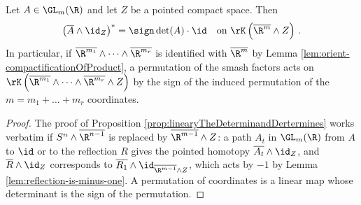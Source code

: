 \begin{lemma}\label{lem:filt-linearMapsOnSmash}
	Let $A\in\GL_m(\R)$ and let $Z$ be a pointed compact space. Then 
	\begin{equation*}
		\left(\overline{A}\wedge \id_Z\right)^*=\sign\det(A)\cdot\id\quad\text{on }\rK\left(\overline{\R^m}\wedge Z\right)\,.
	\end{equation*}
	In particular, if $\overline{\R^{m_1}}\wedge\dots\wedge\overline{\R^{m_r}}$ is identified with $\overline{\R^{m}}$ by Lemma \ref{lem:orient-compactificationOfProduct}, a permutation of the smash factors acts on $\rK\left(\overline{\R^{m_1}}\wedge\dots\wedge\overline{\R^{m_r}}\wedge Z\right)$ by the sign of the induced permutation of the $m=m_1+\dots+m_r$ coordinates.
\end{lemma}
\begin{proof}
	The proof of Proposition \ref{prop:linearyTheDeterminandDertermines} works verbatim if $S^n\wedge\overline{\R^{n-1}}$ is replaced by $\overline{\R^{m-1}}\wedge Z$: a path $A_t$ in $\GL_m(\R)$ from $A$ to $\id$ or to the reflection $R$ gives the pointed homotopy $\overline{A_t}\wedge\id_Z$, and $\overline{R}\wedge\id_Z$ corresponds to $\overline{R_1}\wedge\id_{\overline{\R^{m-1}}\wedge Z}$, which acts by $-1$ by Lemma \ref{lem:reflection-is-minus-one}. A permutation of coordinates is a linear map whose determinant is the sign of the permutation.
\end{proof}

